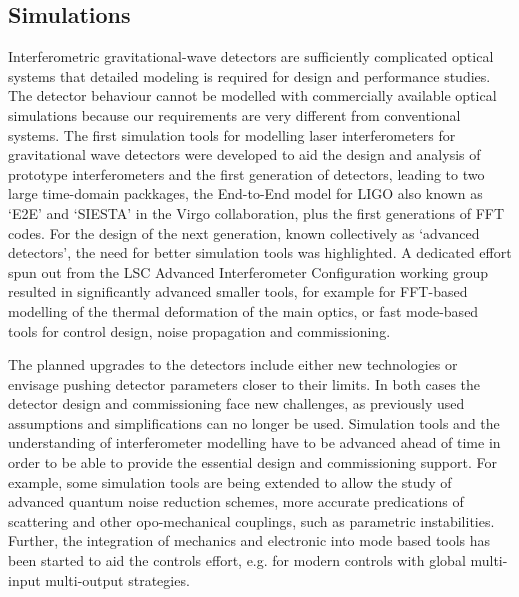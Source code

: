 \subsection{Simulations}
Interferometric gravitational-wave detectors are sufficiently
complicated optical systems that detailed modeling is required for
design and performance studies.  The detector behaviour cannot be
modelled with commercially available optical simulations because
our requirements are very different from conventional systems. 
The first simulation tools for modelling laser interferometers
for gravitational wave detectors were developed to aid the design
and analysis of prototype interferometers and the first generation
of detectors, leading to two large time-domain packkages, 
 the End-to-End model for LIGO also known as `E2E'  and `SIESTA'
in the Virgo collaboration, plus the first generations of FFT codes.
For the design of the next generation, known collectively as
`advanced detectors', the need for better simulation tools was
highlighted. A dedicated effort spun out from the 
LSC Advanced Interferometer Configuration
working group resulted in significantly advanced smaller
tools, for example for FFT-based modelling of the thermal deformation 
of the main optics,  or fast mode-based tools for control design, 
noise propagation and commissioning. 

The planned upgrades to the detectors include either new technologies
or envisage pushing detector parameters closer to their limits. In both cases the 
detector design and commissioning face new challenges, as
previously used assumptions and simplifications can 
no longer be used. Simulation tools and the understanding
of interferometer modelling have to be advanced ahead of time
in order to be able to provide the essential design and commissioning
support. For example, some simulation
tools are being extended to allow the study of advanced 
quantum noise reduction schemes, more accurate predications
of scattering and other opo-mechanical couplings, such
as parametric instabilities. Further, the integration of mechanics and
electronic into mode based tools has been started to aid the 
controls effort, e.g. for modern controls with global multi-input 
multi-output strategies.

